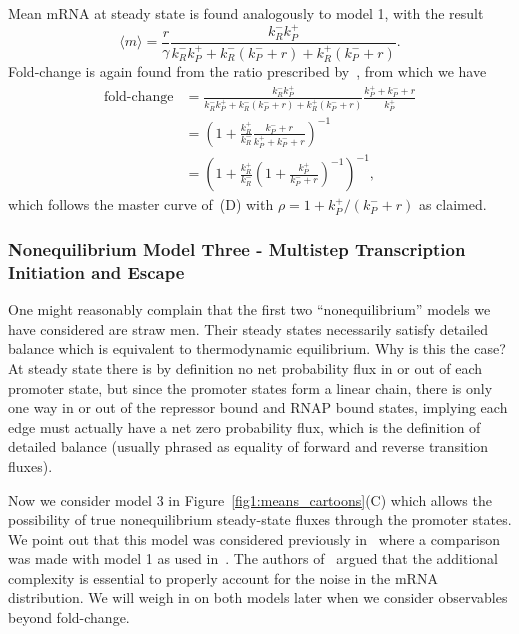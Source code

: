 Mean mRNA at steady state is found analogously to model 1, with the result
\begin{equation}
\langle m\rangle = \frac{r}{\gamma}
        \frac{k_R^- k_P^+}
        {k_R^- k_P^+ + k_R^- (k_P^- + r) + k_R^+ (k_P^- + r)}.
\end{equation}
Fold-change is again found from the ratio prescribed by~, from
which we have
\begin{align}
\text{fold-change}
&=      \frac{k_R^- k_P^+}
        {k_R^- k_P^+ + k_R^- (k_P^- + r) + k_R^+ (k_P^- + r)}
        \frac{k_P^+ + k_P^- + r}{k_P^+}
\\
&=      \left(1 + \frac{k_R^+}{k_R^-}
                \frac{k_P^- + r}{k_P^+ + k_P^- + r}
        \right)^{-1}
\\
&=      \left(1 + \frac{k_R^+}{k_R^-}
        \left(1 + \frac{k_P^+}{k_P^- + r}\right)^{-1}
        \right)^{-1},
\end{align}
which follows the master curve of~(D) with $\rho = 1 +
k_P^+/(k_P^- + r)$ as claimed.

\subsubsection{Nonequilibrium Model Three - Multistep Transcription Initiation
and Escape}
One might reasonably complain that the first two ``nonequilibrium'' models we
have considered are straw men. Their steady states necessarily satisfy detailed
balance which is equivalent to thermodynamic equilibrium. Why is this the case?
At steady state there is by definition no net probability flux in or out of each
promoter state, but since the promoter states form a linear chain, there is only
one way in or out of the repressor bound and RNAP bound states, implying each
edge must actually have a net zero probability flux, which is the definition of
detailed balance (usually phrased as equality of forward and reverse transition
fluxes).

Now we consider model 3 in Figure~\ref{fig1:means_cartoons}(C) which allows the
possibility of true nonequilibrium steady-state fluxes through the promoter
states. We point out that this model was considered previously
in~\cite{Mitarai2015} where a comparison was made with model 1 as used
in~\cite{Jones2014}. The authors of~\cite{Mitarai2015} argued that the
additional complexity is essential to properly account for the noise in the mRNA
distribution. We will weigh in on both models later when we consider observables
beyond fold-change.

